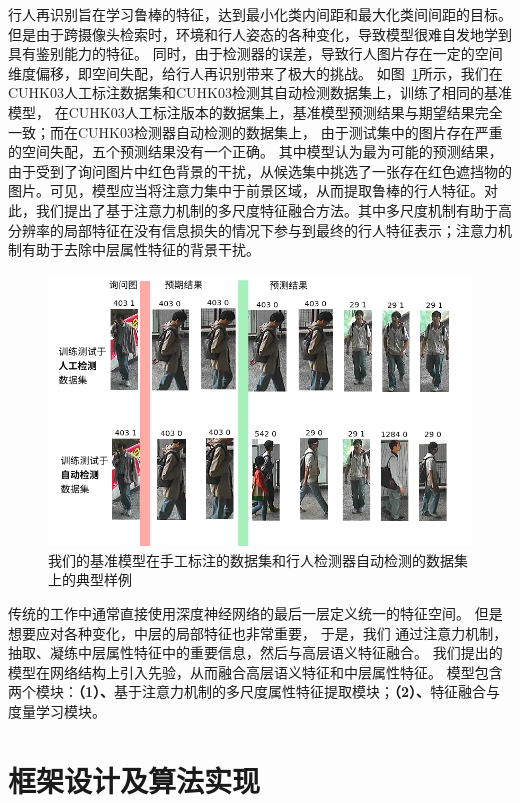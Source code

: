 行人再识别旨在学习鲁棒的特征，达到最小化类内间距和最大化类间间距的目标。
但是由于跨摄像头检索时，环境和行人姿态的各种变化，导致模型很难自发地学到具有鉴别能力的特征。
同时，由于检测器的误差，导致行人图片存在一定的空间维度偏移，即空间失配，给行人再识别带来了极大的挑战。
如图~\ref{fig:label2det}所示，我们在CUHK03人工标注数据集和CUHK03检测其自动检测数据集上，训练了相同的基准模型，
在CUHK03人工标注版本的数据集上，基准模型预测结果与期望结果完全一致；而在CUHK03检测器自动检测的数据集上，
由于测试集中的图片存在严重的空间失配，五个预测结果没有一个正确。
其中模型认为最为可能的预测结果，由于受到了询问图片中红色背景的干扰，从候选集中挑选了一张存在红色遮挡物的图片。可见，模型应当将注意力集中于前景区域，从而提取鲁棒的行人特征。对此，我们提出了基于注意力机制的多尺度特征融合方法。其中多尺度机制有助于高分辨率的局部特征在没有信息损失的情况下参与到最终的行人特征表示；注意力机制有助于去除中层属性特征的背景干扰。

\begin{figure}
	\centering
	\includegraphics[width=.95\textwidth]{fig/2018-04-18-21-53-15.png}
	\caption{我们的基准模型在手工标注的数据集和行人检测器自动检测的数据集上的典型样例} \label{fig:label2det}
\end{figure}

传统的工作中通常直接使用深度神经网络的最后一层定义统一的特征空间。
但是想要应对各种变化，中层的局部特征也非常重要\cite{yu2017devil}，
于是，我们 
通过注意力机制，抽取、凝练中层属性特征中的重要信息，然后与高层语义特征融合。
我们提出的模型在网络结构上引入先验，从而融合高层语义特征和中层属性特征。
模型包含两个模块：\textbf{（1）、}基于注意力机制的多尺度属性特征提取模块；\textbf{（2）、}特征融合与度量学习模块。

\section{框架设计及算法实现}

